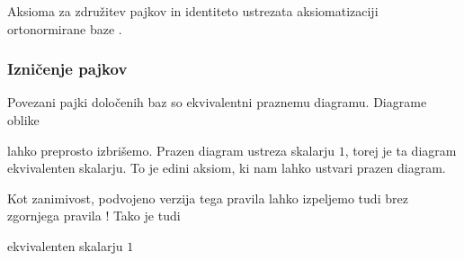 \documentclass[mat1]{fmfdelo}
\begin{document}
Aksioma za združitev pajkov in identiteto ustrezata aksiomatizaciji ortonormirane baze \cite[poglavje 5]{coecke_pavlovic_vicary_2013}.

\subsubsection{Izničenje pajkov} \label{iznicenje}
Povezani pajki določenih baz so ekvivalentni praznemu diagramu. Diagrame oblike
\begin{center}
\end{center}
lahko preprosto izbrišemo. Prazen diagram ustreza skalarju \(1\), torej je ta diagram ekvivalenten skalarju. To je edini aksiom, ki nam lahko ustvari prazen diagram.

Kot zanimivost, podvojeno verzija tega pravila lahko izpeljemo tudi brez zgornjega pravila \cite[poglavje 3.1]{jeandel_et_al}! Tako je tudi
\begin{center}
\end{center}
ekvivalenten skalarju \(1\)
\end{document}
